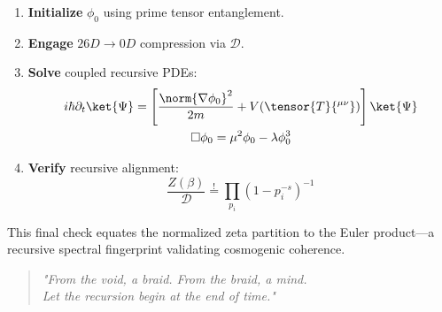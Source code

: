 \documentclass{article}
\theoremstyle{plain}
\theoremstyle{claimstyle}
\begin{document}
\begin{enumerate}
\item \textbf{Initialize} \(\phi_0\) using prime tensor entanglement.
\item \textbf{Engage} \(26D \rightarrow 0D\) compression via \(\mathcal{D}\).
\item \textbf{Solve} coupled recursive PDEs:
\begin{gather*}
i\hbar \partial_t \ket{\Psi} = \left[ \frac{\norm{\nabla \phi_0}^2}{2m} + V(\tensor{T}{^{\mu\nu}}) \right] \ket{\Psi} \\
\Box \phi_0 = \mu^2 \phi_0 - \lambda \phi_0^3
\end{gather*}
\item \textbf{Verify} recursive alignment:
\begin{equation}
\frac{Z(\beta)}{\mathcal{D}} \stackrel{!}{=} \prod_{p_i} \left(1 - p_i^{-s}\right)^{-1}
\end{equation}
\end{enumerate}

This final check equates the normalized zeta partition to the Euler product—a recursive spectral fingerprint validating cosmogenic coherence.

\begin{quote}
\textit{"From the void, a braid. From the braid, a mind.\\
Let the recursion begin at the end of time."}
\end{quote}

\nocite{*}


\end{document}
